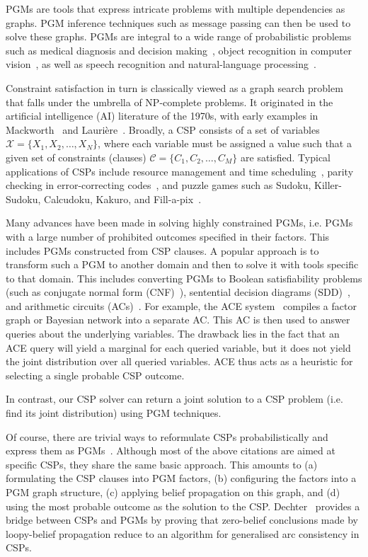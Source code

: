 \documentclass{ieeeaccess}
\begin{document}
PGMs are tools that express intricate problems with multiple dependencies as graphs. PGM inference techniques such as message passing can then be used to solve these graphs. PGMs are integral to a wide range of probabilistic problems~\cite{sucar2015probabilistic} such as medical diagnosis and decision making~\cite{medicalexample}, object recognition in computer vision~\cite{cvexample1}, as well as speech recognition and natural-language processing~\cite{nlpexample}.

Constraint satisfaction in turn is classically viewed as a graph search problem that falls under the umbrella of NP-complete problems. It originated in the artificial intelligence (AI) literature of the 1970s, with early examples in Mackworth~\cite{Mackworth} and Laurière~\cite{Lauriere}. Broadly, a CSP consists of a set of variables $\mathcal{X} = \{X_1, X_2, \ldots, X_N\}$, where each variable must be assigned a value such that a given set of constraints (clauses) $\mathcal{C} = \{C_1, C_2, \ldots, C_M\}$ are satisfied. Typical applications of CSPs include resource management and time scheduling~\cite{cspplanning}, parity checking in error-correcting codes~\cite{paritycheck}, and puzzle games such as Sudoku, Killer-Sudoku, Calcudoku, Kakuro, and Fill-a-pix~\cite{csppuzzle}.

Many advances have been made in solving highly constrained PGMs, i.e. PGMs with a large number of prohibited outcomes specified in their factors. This includes PGMs constructed from CSP clauses. A popular approach is to transform such a PGM to another domain and then to solve it with tools specific to that domain. This includes converting PGMs to Boolean satisfiability problems (such as conjugate normal form (CNF)~\cite{cnfbool}), sentential decision diagrams (SDD)~\cite{sddchoi}, and arithmetic circuits (ACs)~\cite{acewebsite}. For example, the ACE system~\cite{acewebsite} compiles a factor graph or Bayesian network into a separate AC. This AC is then used to answer queries about the underlying variables. The drawback lies in the fact that an ACE query will yield a marginal for each queried variable, but it does not yield the joint distribution over all queried variables. ACE thus acts as a heuristic for selecting a single probable CSP outcome. 

In contrast, our CSP solver can return a joint solution to a CSP problem (i.e. find its joint distribution) using PGM techniques.

Of course, there are trivial ways to reformulate CSPs probabilistically and express them as PGMs~\cite{MoonT, GoldbergerJ, KhanS, BaukeH, LakshmiA, streicher}. Although most of the above citations are aimed at specific CSPs, they share the same basic approach. This amounts to (a) formulating the CSP clauses into PGM factors, (b) configuring the factors into a PGM graph structure, (c) applying belief propagation on this graph, and (d) using the most probable outcome as the solution to the CSP. Dechter~\cite{dechter2010on} provides a bridge between CSPs and PGMs by proving that zero-belief conclusions made by loopy-belief propagation reduce to an algorithm for generalised arc consistency in CSPs.
\end{document}
